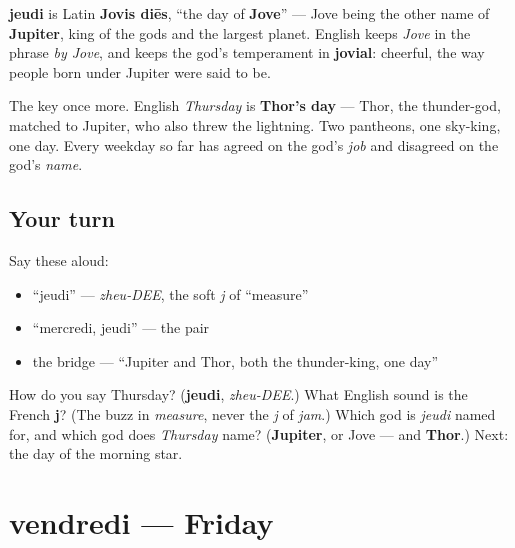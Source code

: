 \begin{cousinweb}
\textbf{jeudi} is Latin \textbf{Jovis diēs}, \textquotedblleft{}the day of \textbf{Jove}\textquotedblright{} — Jove being the other name of \textbf{Jupiter}, king of the gods and the largest planet. English keeps \emph{Jove} in the phrase \emph{by Jove}, and keeps the god's temperament in \textbf{jovial}: cheerful, the way people born under Jupiter were said to be.
\end{cousinweb}

\begin{culture}
The key once more. English \emph{Thursday} is \textbf{Thor's day} — Thor, the thunder-god, matched to Jupiter, who also threw the lightning. Two pantheons, one sky-king, one day. Every weekday so far has agreed on the god's \emph{job} and disagreed on the god's \emph{name}.
\end{culture}

\subsection*{Your turn}
Say these aloud:

\begin{itemize}
\raggedright
  \item \textquotedblleft{}jeudi\textquotedblright{} — \emph{zheu-DEE}, the soft \emph{j} of \textquotedblleft{}measure\textquotedblright{}
  \item \textquotedblleft{}mercredi, jeudi\textquotedblright{} — the pair
  \item the bridge — \textquotedblleft{}Jupiter and Thor, both the thunder-king, one day\textquotedblright{}
\end{itemize}

\begin{tcolorbox}[breakable,colback=teal!4,colframe=teal!35!black,title={Before you move on}]
How do you say Thursday? (\textbf{jeudi}, \emph{zheu-DEE}.) What English sound is the French \textbf{j}? (The buzz in \emph{measure}, never the \emph{j} of \emph{jam}.) Which god is \emph{jeudi} named for, and which god does \emph{Thursday} name? (\textbf{Jupiter}, or Jove — and \textbf{Thor}.) Next: the day of the morning star.
\end{tcolorbox}
\section[vendredi]{vendredi — Friday}

\label{lesson:FR-C07-vendredi}



